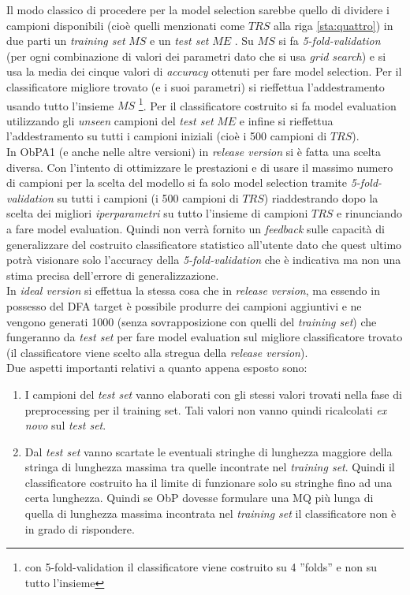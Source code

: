  
 Il modo classico di procedere  per la model selection sarebbe quello di dividere i campioni disponibili (cioè quelli menzionati come $TRS$ alla riga \ref{sta:quattro}) in due parti un \textit{training set} $MS$ e un \textit{test set} $ME$ . Su $MS$ si fa \textit{5-fold-validation} (per ogni combinazione di valori dei parametri dato che si usa \textit{grid search}) e si usa la media dei cinque valori di \textit{accuracy} ottenuti per fare model selection. Per il classificatore migliore trovato (e i suoi parametri) si rieffettua l'addestramento usando tutto l'insieme $MS$ \footnote{con 5-fold-validation il classificatore viene costruito su 4 ''folds'' e non su tutto l'insieme}. Per il classificatore costruito si fa model evaluation utilizzando gli \textit{unseen} campioni del \textit{test set} $ME$  e infine si rieffettua l'addestramento su tutti i campioni  iniziali (cioè i 500 campioni di $TRS$). \\
In \ac{ObPA}1 (e anche nelle altre versioni) in \textit{release version} si è fatta una scelta diversa. Con l'intento di ottimizzare le prestazioni e di usare il massimo numero di campioni per la scelta del modello si fa solo model selection tramite \textit{5-fold-validation} su tutti i campioni (i 500 campioni di $TRS$) riaddestrando dopo la scelta dei migliori \textit{iperparametri} su tutto l'insieme di campioni $TRS$ e rinunciando a fare model evaluation. Quindi non verrà fornito un \textit{feedback}  sulle capacità di generalizzare del costruito classificatore statistico all'utente dato che quest ultimo potrà visionare solo l'accuracy della \textit{5-fold-validation} che è indicativa ma non una stima precisa dell'errore di generalizzazione.\\
In \textit{ideal version} si effettua la stessa cosa che in \textit{release version}, ma essendo in possesso del \ac{DFA} target è possibile  produrre dei campioni aggiuntivi e ne vengono generati 1000  (senza sovrapposizione con quelli del \textit{training set}) che fungeranno da \textit{test set} per fare model evaluation sul migliore classificatore trovato (il classificatore viene scelto alla stregua della \textit{release version}).\\
Due aspetti importanti relativi a quanto appena esposto sono:
\begin{enumerate}
\item I campioni del \textit{test set} vanno elaborati con gli stessi valori trovati nella fase di preprocessing per il training set. Tali valori non vanno quindi ricalcolati \textit{ex novo} sul \textit{test set}.
\item Dal \textit{test set} vanno scartate le eventuali stringhe di lunghezza maggiore della stringa di lunghezza massima tra quelle incontrate nel \textit{training set}. Quindi il classificatore costruito ha il limite di funzionare solo su stringhe fino ad una certa lunghezza. Quindi se \ac{ObP} dovesse formulare una \ac{MQ} più lunga di quella di lunghezza massima incontrata nel \textit{training set} il classificatore non è in grado di rispondere. 
\end {enumerate}

